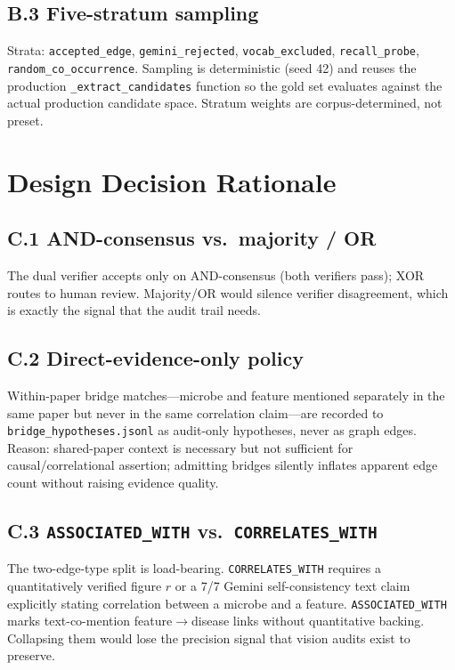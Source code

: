 \documentclass[10pt,twocolumn,letterpaper]{article}
\begin{document}
\subsection*{B.3 Five-stratum sampling}
\noindent Strata: \texttt{accepted\_edge}, \texttt{gemini\_rejected},
\texttt{vocab\_excluded}, \texttt{recall\_probe},
\texttt{random\_co\_occurrence}. Sampling is deterministic (seed 42) and
reuses the production \texttt{\_extract\_candidates} function so the gold
set evaluates against the actual production candidate space. Stratum
weights are corpus-determined, not preset.

\section{Design Decision Rationale}
\label{app:design}

\subsection*{C.1 AND-consensus vs.\ majority / OR}
\noindent The dual verifier accepts only on AND-consensus
(both verifiers pass); XOR routes to human review. Majority/OR would
silence verifier disagreement, which is exactly the signal that the audit
trail needs.

\subsection*{C.2 Direct-evidence-only policy}
\noindent Within-paper bridge matches---microbe and feature mentioned
separately in the same paper but never in the same correlation
claim---are recorded to \texttt{bridge\_hypotheses.jsonl} as audit-only
hypotheses, never as graph edges. Reason: shared-paper context is
necessary but not sufficient for causal/correlational assertion; admitting
bridges silently inflates apparent edge count without raising evidence
quality.

\subsection*{C.3 \texttt{ASSOCIATED\_WITH} vs.\ \texttt{CORRELATES\_WITH}}
\noindent The two-edge-type split is load-bearing.
\texttt{CORRELATES\_WITH} requires a quantitatively verified figure $r$ or
a 7/7 Gemini self-consistency text claim explicitly stating correlation
between a microbe and a feature. \texttt{ASSOCIATED\_WITH} marks
text-co-mention feature$\rightarrow$disease links without quantitative
backing. Collapsing them would lose the precision signal that vision
audits exist to preserve.
\end{document}
